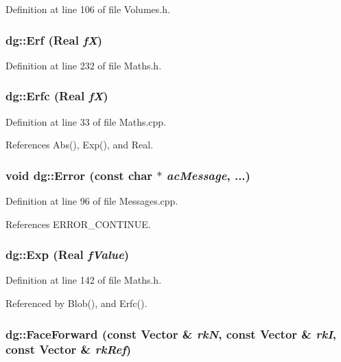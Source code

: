 Definition at line 106 of file Volumes.h.
\subsubsection{ dg::Erf ({\bf Real} {\em f\-X})\hspace{0.3cm}{\tt  [inline]}}\label{namespacedg_a110}




Definition at line 232 of file Maths.h.
\subsubsection{ dg::Erfc ({\bf Real} {\em f\-X})}\label{namespacedg_a86}




Definition at line 33 of file Maths.cpp.

References Abs(), Exp(), and Real.
\subsubsection{\setlength{\rightskip}{0pt plus 5cm}void dg::Error (const char $\ast$ {\em ac\-Message}, ...)\hspace{0.3cm}{\tt  [inline]}}\label{namespacedg_a124}




Definition at line 96 of file Messages.cpp.

References ERROR\_\-CONTINUE.
\subsubsection{ dg::Exp ({\bf Real} {\em f\-Value})\hspace{0.3cm}{\tt  [inline]}}\label{namespacedg_a93}




Definition at line 142 of file Maths.h.

Referenced by Blob(), and Erfc().
\subsubsection{ dg::Face\-Forward (const {\bf Vector} \& {\em rk\-N}, const {\bf Vector} \& {\em rk\-I}, const {\bf Vector} \& {\em rk\-Ref})\hspace{0.3cm}{\tt  [inline]}}\label{namespacedg_a180}




